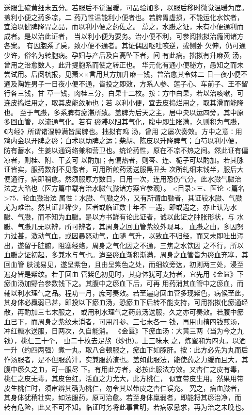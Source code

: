 \documentclass[a4paper,12pt,UTF8,twoside]{ctexbook}
\begin{document}
送服生硫黄细末五分。若服后不觉温暖，可品验加多，以服后移时微觉温暖为度。盖利小便之药多凉，二 
药乃性温能利小便者也。若脾胃虚损，不能运化水饮者，宜治以健脾降胃之品，而以利小便之药佐之。 
总之，水臌之证，未有小便通利而成者。是以治此证者， 
当以利小便为要务。治小便不利，可参阅拙拟治癃闭诸方各案。 
有因胞系了戾，致小便不通者。其证偶因呕吐咳逆，或侧卧 
欠伸，仍可通少许，俗名为转胞病。孕妇与产后及自高坠下者，间 
有此病。拙拟有升麻黄 汤，曾用之治愈数人，此升提胞系而使之转正也。 
华元化有通小便秘方，愚知之而未尝试用。后阅杭报，见萧××言用其方加升麻一钱，曾治愈其令妹二 
日一夜小便不通及陶姓男子一日夜小便不通，皆投之即效，方系人参、莲子心、车前子、王不留行各三钱，甘 
草一钱，肉桂三分，白果十二枚。按∶方中白果，若以治咳嗽，可连皮捣烂用之，取其皮能敛肺也；若 
以利小便，宜去皮捣烂用之，取其滑而能降也。 
至于气臌，多系脾有瘀滞所致。盖脾为后天之主，居中央以运四旁，其中原多回血管，以流通气化。若有 
瘀滞以阻其气化，腹中即生胀满，久则积为气臌，《内经》所谓诸湿肿满皆属脾也。拙拟有鸡 汤，曾用 
之屡次奏效。方中之意∶用鸡内金以开脾之瘀；白术以助脾之运；柴胡、陈皮以升降脾气；白芍以利小便， 
防有蓄水，生姜以通窍络兼和营卫也。统论药性，原在不凉不热之间。然此证有偏凉者，则桂、附、干姜可 
以酌加；有偏热者，则芩、连、栀子可以酌加。若其脉证皆实，服药数剂不见愈者，可用所煎药汤送服黑丑头 
次所轧细末钱半，服后大便通行，病即稍愈。然须服原方数日，日用一次，连用恐伤气分。此水臌气臌治 
法之大略也（医方篇中载有治水臌气臌诸方案宜参观）。 
<目录>三、医论
<篇名>75．论血臌治法
属性：水臌、气臌之外，又有所谓血臌者，其证较水臌、气臌尤为难治。然其证甚稀少，医者或临证数十年不 
一遇，即或遇之，亦止认为水臌、气臌，而不知为血臌。是以方书鲜有论此证者，诚以此证之肿胀形状，与 
水臌、气臌几无以辨，所可辨者，其周身之回血管紫纹外现耳。 
血臌之由，多因努力过甚，激动气血，或因暴怒动气，血随 
气升，以致血不归经，而又未即吐出泻出，遂留于脏腑，阻塞经络，周身之气化因之不通，三焦之水饮因 
之不行，所以血臌之证初起，多兼水与气也。迨至瘀血渐积渐满，周身之血管皆为瘀血充塞，其回血管 
肤浅易见，遂呈紫色，且由呈紫色之处，而细纹旁达，初则两三处，浸至遍身皆是紫纹。若于回血 
管紫色初见时，其身体犹可支持者，宜先用《金匮》下瘀血汤加野台参数钱下之。其腹中之瘀血下后，可再 
用药消其血管中之瘀血，而辅以利水理气之品。程功一月，庶可奏效。若至遍身回血管多现紫色，病候至此， 
其身体必羸弱已甚，即投以下瘀血汤，恐瘀血下后转不能支持，可用拙拟化瘀通经散，再酌加三七末服之， 
或用利水理气之药煎汤送服，久之亦可奏效。若腹中瘀血已下，而周身之紫纹未消者，可用丹参、三七末各一 
钱，再用山楂四钱煎汤，冲红糖水送服，日两次，久自能消。 
《金匮》下瘀血汤∶大黄三两（当为今之九钱），桃仁三十个， 虫二十枚去足熬（炒也）。上三味末 
之，炼蜜和为四丸，以酒一升（约四两强）煮一丸，取八合顿服之，瘀血下如豚肝。按∶此方必先为丸而后 
作汤服者，是不但服药汁，实兼服药渣也。盖如此服法，能使药之力缓而且大，其腹中瘀久之血，可一服尽 
下。有用此方者，必按此服法方效。又杏仁之皮有毒，桃仁之皮无毒，其皮色红，活血之力尤大，此方桃仁， 
似宜带皮生用。然果用带皮生桃仁时，须审辨其确为桃仁，勿令其以带皮之杏仁误充。 
究之，病血臌者，其身体犹稍壮实，如法服药，原可治愈。若至身体羸弱者，即能将其瘀治净，而 
转有危险，此又不可不知。临证时务将此事言明，若病家恳求，再为治之未晚也。 
\end{document}

